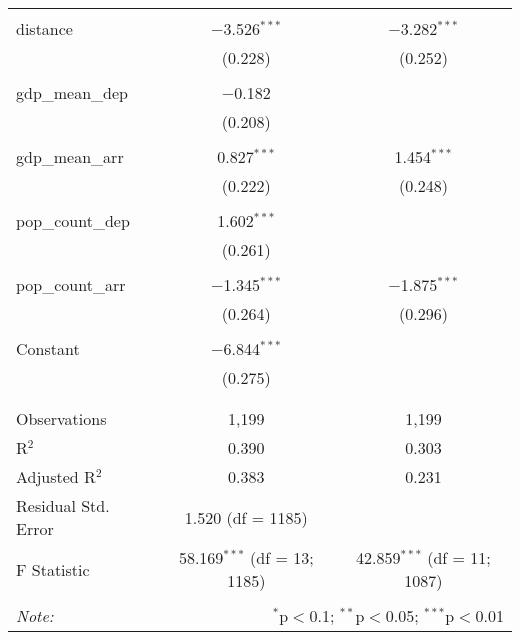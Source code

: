 \begin{table}[!htbp]
\begin{tabular}{@{\extracolsep{5pt}}lcc}
  & & \\ 
 distance & $-$3.526$^{***}$ & $-$3.282$^{***}$ \\ 
  & (0.228) & (0.252) \\ 
  & & \\ 
 gdp\_mean\_dep & $-$0.182 &  \\ 
  & (0.208) &  \\ 
  & & \\ 
 gdp\_mean\_arr & 0.827$^{***}$ & 1.454$^{***}$ \\ 
  & (0.222) & (0.248) \\ 
  & & \\ 
 pop\_count\_dep & 1.602$^{***}$ &  \\ 
  & (0.261) &  \\ 
  & & \\ 
 pop\_count\_arr & $-$1.345$^{***}$ & $-$1.875$^{***}$ \\ 
  & (0.264) & (0.296) \\ 
  & & \\ 
 Constant & $-$6.844$^{***}$ &  \\ 
  & (0.275) &  \\ 
  & & \\ 
\hline \\[-1.8ex] 
Observations & 1,199 & 1,199 \\ 
R$^{2}$ & 0.390 & 0.303 \\ 
Adjusted R$^{2}$ & 0.383 & 0.231 \\ 
Residual Std. Error & 1.520 (df = 1185) &  \\ 
F Statistic & 58.169$^{***}$ (df = 13; 1185) & 42.859$^{***}$ (df = 11; 1087) \\ 
\hline 
\hline \\[-1.8ex] 
\textit{Note:}  & \multicolumn{2}{r}{$^{*}$p$<$0.1; $^{**}$p$<$0.05; $^{***}$p$<$0.01} \\ 
\end{tabular} 
\end{table} 
